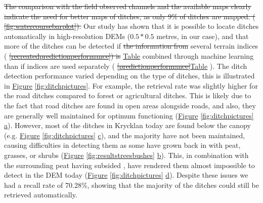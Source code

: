 \documentclass[11pt, review]{elsarticle} %
\providecommand{\DIFaddtex}[1]{{\protect\color{blue}\uwave{#1}}} %
\providecommand{\DIFdeltex}[1]{{\protect\color{red}\sout{#1}}}                      %
\providecommand{\DIFaddbegin}{} %
\providecommand{\DIFaddend}{} %
\providecommand{\DIFdelbegin}{} %
\providecommand{\DIFdelend}{} %
\providecommand{\DIFadd}[1]{\texorpdfstring{\DIFaddtex{#1}}{#1}} %
\providecommand{\DIFdel}[1]{\texorpdfstring{\DIFdeltex{#1}}{}} %
\begin{document}
\DIFdelbegin \DIFdel{The comparison with the field observed channels and the available maps clearly indicate the need for better maps of ditches, as only 9\% of ditches are mapped.  (}%
\DIFdel{\ref{fig:watercoursebarplot}). }\DIFdelend Our study has shown that it is possible to locate ditches automatically in high-resolution DEMs ($0.5  * 0.5 $ metres, in our case), and that more of the ditches can be detected if \DIFdelbegin \DIFdel{the information from }\DIFdelend several terrain indices (\DIFdelbegin %
\DIFdel{\ref{recreatedpredictionperformance}) is }\DIFdelend \DIFaddbegin \hyperref[predictionperformance]{Table} \DIFadd{\ref{predictionperformance}) are }\DIFaddend combined through machine learning than if indices are used separately (\DIFdelbegin %
\DIFdel{\ref{predictionperformance}}\DIFdelend \DIFaddbegin \hyperref[recreatedpredictionperformance]{Table} \DIFadd{\ref{recreatedpredictionperformance}}\DIFaddend ). The ditch detection performance varied depending on the type of ditches, this is illustrated in \hyperref[fig:ditchpictures]{Figure} \ref{fig:ditchpictures}. For example, the retrieval rate was slightly higher for the road ditches compared to forest or agricultural ditches. This is likely due to the fact that  road ditches are found in open areas alongside roads, and also,   they are generally well maintained for optimum functioning (\hyperref[fig:ditchpictures]{Figure} \ref{fig:ditchpictures} \hyperref[fig:ditchpictures]{a}). However, most of the ditches in Krycklan today are found below the canopy (e.g. \hyperref[fig:ditchpictures]{Figure} \ref{fig:ditchpictures} \hyperref[fig:ditchpictures]{c}), and the majority have not been maintained, causing difficulties in detecting them as some have grown back in with peat, grasses, or shrubs (\hyperref[fig:resultstreesbushes]{Figure} \ref{fig:resultstreesbushes} \hyperref[fig:resultstreesbushes]{b}). This, in combination with the surrounding peat having subsided \citep{heikurainen}, have rendered them almost impossible to detect in the DEM today (\hyperref[fig:ditchpictures]{Figure} \ref{fig:ditchpictures} \hyperref[fig:ditchpictures]{d}). Despite these issues we had a recall rate of 70.28\%, showing that the majority of the ditches could still be retrieved automatically.
\end{document}
